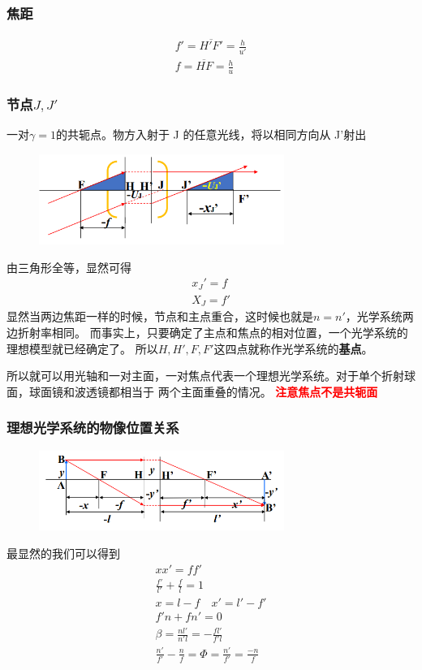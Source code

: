 \subsubsection{焦距}
\begin{align}
f'=\overline{H'F'}=\frac{h}{u'} \tag{2.3.3.a}\\
f=\overline{HF}=\frac{h}{u} \tag{2.3.3.b}
\end{align}
\subsubsection{节点$J,J'$}
一对$\gamma=1$的共轭点。物方入射于 J 的任意光线，将以相同方向从 J’射出
        \begin{figure}[H]
            \centering
            \includegraphics[width=8cm]{img/3.2.png}
            \end{figure}
由三角形全等，显然可得
\begin{align}
    x_J'=f \tag{2.3.4.a} \\
    X_J=f' \tag{2.3.4.b}
 \end{align}
 显然当两边焦距一样的时候，节点和主点重合，这时候也就是$n=n'$，光学系统两边折射率相同。
而事实上，只要确定了主点和焦点的相对位置，一个光学系统的理想模型就已经确定了。
所以$H,H',F,F'$这四点就称作光学系统的\textbf{基点}。

所以就可以用光轴和一对主面，一对焦点代表一个理想光学系统。对于单个折射球面，球面镜和波透镜都相当于
两个主面重叠的情况。
\textcolor{red}{\textbf{注意焦点不是共轭面}}
\subsubsection{理想光学系统的物像位置关系}
        \begin{figure}[H]
            \centering
            \includegraphics[width=8cm]{img/3.3.png}
            \end{figure}
最显然的我们可以得到
\begin{align}
    x x'=f f' \tag{2.3.5.a}\\
    \frac{f'}{l'}+\frac{f}{l}=1 \tag{2.3.5.b}\\
    x=l-f \quad x'=l'-f' \tag{2.3.5.c} \\
    f'n+fn'=0 \tag{2.3.5.d} \\
    \beta=\frac{nl'}{n'l}=-\frac{fl'}{f'l} \tag{2.3.5.e}\\
    \frac{n'}{f'}-\frac{n}{f}=\Phi=\frac{n'}{f'}=\frac{-n}{f} \tag{2.3.5.f}
\end{align}

